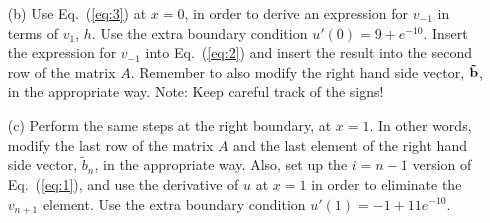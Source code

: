 \documentclass[11pt,a4wide]{article}
\newcommand{\eq} [1]{Eq.\ (\ref{eq:#1})}
\begin{document}
\begin{itemize}
  \item[(b)] Use \eq{3} at $x=0$, in order to derive an expression for $v_{-1}$ in terms of $v_1$, $h$. Use the extra boundary condition $u'(0)=9+e^{-10}$. Insert the expression for $v_{-1}$ into \eq{2} and insert the result into the second row of the matrix $A$. Remember to also modify the right hand side vector, ${\bf \tilde{b}}$, in the appropriate way. Note: Keep careful track of the signs!
  \item[(c)] Perform the same steps at the right boundary, at $x=1$. In other words, modify the last row of the matrix $A$ and the last element of the right hand side vector, $\tilde{b}_n$, in the appropriate way. Also, set up the $i=n-1$ version of \eq{1}, and use the derivative of $u$ at $x=1$ in order to eliminate the $v_{n+1}$ element. Use the extra boundary condition $u'(1)=-1+11e^{-10}$.



\end{itemize}
\end{document}
